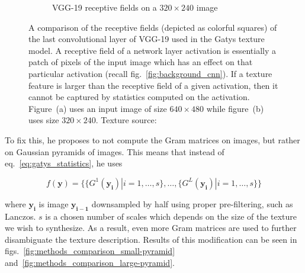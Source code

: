 \begin{figure}[ht]
\begin{subfigure}[b]{0.48\textwidth}
        \caption{VGG-19 receptive fields on a \(320 \times 240\) image}
        \label{fig:methods_receptive_field_lvl1}
    \end{subfigure}
    \caption{A comparison of the receptive fields (depicted as colorful squares) of the last convolutional layer of VGG-19 used in the Gatys texture model. A receptive field of a network layer activation is essentially a patch of pixels of the input image which has an effect on that particular activation (recall fig.~\ref{fig:background_cnn}). If a texture feature is larger than the receptive field of a given activation, then it cannot be captured by statistics computed on the activation. Figure~(a) uses an input image of size \(640 \times 480\) while figure~(b) uses size \(320 \times 240\). Texture source: \citet{Pixar128}}
    \label{fig:methods_receptive_field}
\end{figure}

To fix this, he proposes to not compute the Gram matrices on images, but rather on Gaussian pyramids of images. This means that instead of eq.~\ref{eq:gatys_statistics}, he uses

\begin{equation}
    \label{eq:snelgrove_statistics}
    f(\bm{y}) = \{\{G^1(\bm{y_i}) | i = 1, \dots, s\}, \dots, \{G^L(\bm{y_i}) | i = 1, \dots, s\}\}
\end{equation}

where \(\bm{y_i}\) is image \(\bm{y_{i - 1}}\) downsampled by half using proper pre-filtering, such as Lanczos. \(s\) is a chosen number of scales which depends on the size of the texture we wish to synthesize. As a result, even more Gram matrices are used to further disambiguate the texture description. Results of this modification can be seen in figs.~\ref{fig:methods_comparison_small-pyramid} and~\ref{fig:methods_comparison_large-pyramid}.

